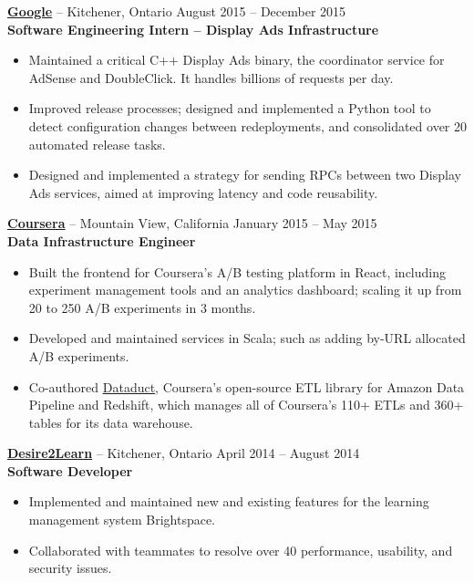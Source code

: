 \documentclass{letter}
\begin{document}
\vspace{-1.5mm}
{\bfseries \href{https://www.google.com}{\uline{Google}}} -- Kitchener, Ontario \hfill August 2015 -- December 2015\\
{\bfseries Software Engineering Intern -- Display Ads Infrastructure}
\vspace{-3mm}
\begin{itemize}
    \item Maintained a critical C++ Display Ads binary, the coordinator service
      for AdSense and DoubleClick. It handles billions of requests per day.
    \item Improved release processes; designed and implemented a Python tool to
        detect configuration changes between redeployments, and consolidated
        over 20 automated release tasks.
    \item Designed and implemented a strategy for sending RPCs between two
      Display Ads services, aimed at improving latency and code reusability.
\end{itemize}

\vspace{-1.5mm}
{\bfseries \href{https://www.coursera.org}{\uline{Coursera}}} -- Mountain View, California \hfill January 2015 -- May 2015 \\
{\bfseries Data Infrastructure Engineer}
\vspace{-3mm}
\begin{itemize}
    \item Built the frontend for Coursera's A/B testing platform in React, including
      experiment management tools and an analytics dashboard; scaling it up from 20 to
      250 A/B experiments in 3 months.
    \item Developed and maintained services in Scala; such as adding by-URL
      allocated A/B experiments.
    \item Co-authored \href{https://github.com/coursera/dataduct}{\uline{Dataduct}},
      Coursera's open-source ETL library for Amazon Data Pipeline and
      Redshift, which manages all of Coursera's 110+ ETLs and 360+ tables for its data warehouse.
\end{itemize}

\vspace{-1.5mm}
{\bfseries \href{http://www.d2l.com}{\uline{Desire2Learn}}} -- Kitchener, Ontario \hfill April 2014 -- August 2014 \\
{\bfseries Software Developer}
\vspace{-3mm}
\begin{itemize}
    \item Implemented and maintained new and existing features for the learning
      management system Brightspace.
    \item Collaborated with teammates to resolve over 40 performance, usability, and security issues.
\end{itemize}
\end{document}
